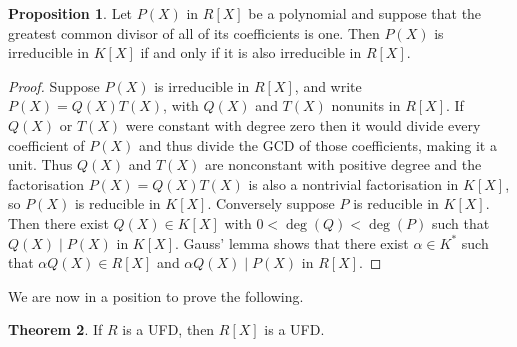 \documentclass{article}
\newcommand{\rb}[1]{\left( #1 \right)}
\renewcommand{\sb}[1]{\left[ #1 \right]}
\theoremstyle{definition}\newtheorem{definition}{Definition}[subsection]
\theoremstyle{definition}\newtheorem{remark}[definition]{Remark}
\theoremstyle{definition}\newtheorem*{example}{Example}
\theoremstyle{definition}\newtheorem*{note}{Note}
\newtheorem{proposition}[definition]{Proposition}
\newtheorem{theorem}[definition]{Theorem}
\begin{document}
\begin{proposition}
Let $ P\rb{X} $ in $ R\sb{X} $ be a polynomial and suppose that the greatest common divisor of all of its coefficients is one. Then $ P\rb{X} $ is irreducible in $ K\sb{X} $ if and only if it is also irreducible in $ R\sb{X} $.
\end{proposition}

\begin{proof}
Suppose $ P\rb{X} $ is irreducible in $ R\sb{X} $, and write $ P\rb{X} = Q\rb{X}T\rb{X} $, with $ Q\rb{X} $ and $ T\rb{X} $ nonunits in $ R\sb{X} $. If $ Q\rb{X} $ or $ T\rb{X} $ were constant with degree zero then it would divide every coefficient of $ P\rb{X} $ and thus divide the GCD of those coefficients, making it a unit. Thus $ Q\rb{X} $ and $ T\rb{X} $ are nonconstant with positive degree and the factorisation $ P\rb{X} = Q\rb{X}T\rb{X} $ is also a nontrivial factorisation in $ K\sb{X} $, so $ P\rb{X} $ is reducible in $ K\sb{X} $. Conversely suppose $ P $ is reducible in $ K\sb{X} $. Then there exist $ Q\rb{X} \in K\sb{X} $ with $ 0 < \deg\rb{Q} < \deg\rb{P} $ such that $ Q\rb{X} \mid P\rb{X} $ in $ K\sb{X} $. Gauss' lemma shows that there exist $ \alpha \in K^* $ such that $ \alpha Q\rb{X} \in R\sb{X} $ and $ \alpha Q\rb{X} \mid P\rb{X} $ in $ R\sb{X} $.
\end{proof}

We are now in a position to prove the following.

\begin{theorem}
If $ R $ is a UFD, then $ R\sb{X} $ is a UFD.
\end{theorem}
\end{document}

